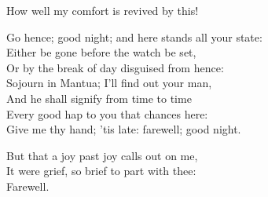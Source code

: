 \begin{speech}
How well my comfort is revived by this! \\
\end{speech}
\begin{speech}
Go hence; good night; and here stands all your state:
\\
Either be gone before the watch be set, \\
Or by the break of day disguised from hence: \\
Sojourn in Mantua; I'll find out your man, \\
And he shall signify from time to time \\
Every good hap to you that chances here: \\
Give me thy hand; 'tis late: farewell; good night. \\
\end{speech}
\begin{speech}
But that a joy past joy calls out on me, \\
It were grief, so brief to part with thee: \\
Farewell.  \\
\end{speech}


